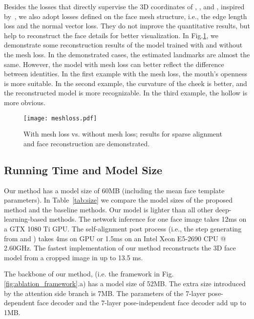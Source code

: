 \documentclass[journal]{IEEEtran}
\begin{document}
	{}
	Besides the losses that directly supervise the 3D coordinates of , , and , inspired by~\cite{pixel2mesh}, we also adopt losses defined on the face mesh structure, i.e., the edge length loss and the normal vector loss. They do not improve the quantitative results, but help to reconstruct the face details for better visualization. In Fig.\ref{fig:meshloss}, we demonstrate some reconstruction results of the model trained with and without the mesh loss. In the demonstrated cases, the estimated landmarks are almost the same. However, the model with mesh loss can better reflect the difference between identities. In the first example with the mesh loss, the mouth's openness is more suitable. In the second example, the curvature of the cheek is better, and the reconstructed model is more recognizable. In the third example, the hollow is more obvious.
	
	\begin{figure}[hpt]
		\centering
		\texttt{[image: meshloss.pdf]}
		\caption{With mesh loss vs. without mesh loss; results for sparse alignment and face reconstruction are demonstrated.}
		\label{fig:meshloss}
	\end{figure}
	
	

	\subsection{Running Time and Model Size}
	Our method has a model size of 60MB (including the mean face template parameters). In Table~\ref{tab:size} we compare the model sizes of the proposed method and the baseline methods.  Our model is lighter than all other deep-learning-based methods. The network inference for one face image takes 12ms on a GTX 1080 Ti GPU. The self-alignment post process (i.e., the step generating  from  and ) takes 4ms on GPU or 1.5ms on an Intel Xeon E5-2690 CPU @ 2.60GHz. The fastest implementation of our method reconstructs the 3D face model from a cropped image in up to 13.5 ms.
	
	The backbone of our method, (i.e. the framework in Fig.\ref{fig:ablation_framework}.a) has a model size of 52MB. The extra size introduced by the attention side branch is 7MB. The parameters of the 7-layer pose-dependent face decoder and the 7-layer pose-independent face decoder add up to 1MB.
	
\end{document}
